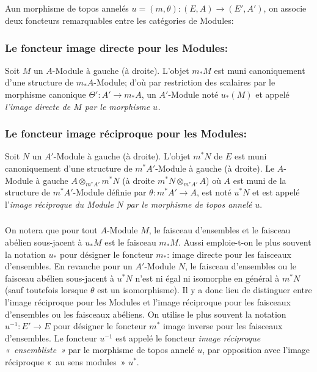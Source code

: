 \documentclass[10pt]{../fichiers-configuration-latex/smfart}
\begin{document}
\subsection{}
A\pageoriginale un morphisme de topos annelés
$u=(m,\theta):(E,A)\rightarrow (E',A')$, on associe deux
foncteurs remarquables entre les catégories de Modules:

\subsubsection{Le foncteur image directe pour les
  Modules:}
Soit $M$ un $A$-Module à gauche (\resp à droite). L'objet
$m_{\ast}M$ est muni canoniquement d'une structure de
$m_{\ast}A$-Module; d'où par restriction des scalaires par le
morphisme canonique $\Theta':A'\rightarrow m_{\ast}A$, un
$A'$-Module noté $u_{\ast}(M)$ et appelé \emph{l'image directe de
$M$ par le morphisme $u$.}

\subsubsection{Le foncteur image réciproque pour les
  Modules:}
Soit $N$ un $A'$-Module à gauche (\resp à droite). L'objet
$m^{\ast}N$ de $E$ est muni canoniquement d'une structure de
$m^{\ast}A'$-Module à gauche (\resp à droite). Le $A$-Module à
gauche $A\otimes_{m^{\ast}A'}m^{\ast}N$ (\resp à droite
$m^{\ast}N\otimes_{m^{\ast}A'}A$) où $A$ est muni de la structure de
$m^{\ast}A'$-Module définie par $\theta:m^{\ast}A'\rightarrow A$,
est noté $u^{\ast}N$ et est appelé l'\emph{image réciproque du
Module $N$ par le morphisme de topos annelé} $u$.

\subsubsection{}
On notera que pour tout $A$-Module $M$, le faisceau d'ensembles et
le faisceau abélien sous-jacent à $u_{\ast}M$ est le faisceau
$m_{\ast}M$. Aussi emploie-t-on le plus souvent la notation
$u_{\ast}$ pour désigner le foncteur $m_{\ast}$: image directe pour
les faisceaux d'ensembles. En revanche pour un $A'$-Module $N$, le
faisceau d'ensembles ou le faisceau abélien sous-jacent à
$u^{\ast}N$ n'est ni égal ni isomorphe en général à $m^{\ast}N$
(sauf toutefois lorsque $\theta$ est un isomorphisme). Il y a donc
lieu de distinguer entre l'image réciproque pour les Modules et
l'image réciproque pour les faisceaux d'ensembles ou les faisceaux
abéliens. On utilise le plus souvent la notation
$u^{-1}:E'\rightarrow E$ pour désigner le foncteur $m^{\ast}$ image
inverse pour les faisceaux d'ensembles. Le foncteur $u^{-1}$ est
appelé le foncteur \emph{image réciproque « ensembliste »} par
le morphisme de topos annelé $u$, par opposition avec l'image
réciproque « au sens modules »  $u^{\ast}$.
\end{document}
